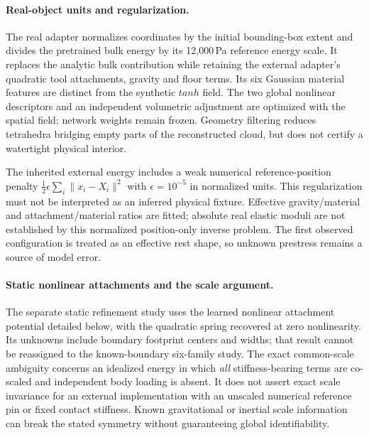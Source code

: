 \paragraph{Real-object units and regularization.}
The real adapter normalizes coordinates by the initial bounding-box extent
and divides the pretrained bulk energy by its 12,000\,Pa reference energy
scale. It replaces the analytic bulk contribution while retaining the
external adapter's quadratic tool attachments, gravity and floor terms.
Its six Gaussian material features are distinct from the synthetic
$tanh$ field. The two global nonlinear descriptors and an independent
volumetric adjustment are optimized with the spatial field; network weights
remain frozen. Geometry filtering reduces tetrahedra bridging empty parts
of the reconstructed cloud, but does not certify a watertight physical
interior.

The inherited external energy includes a weak numerical reference-position
penalty $\tfrac12\epsilon\sum_i\|x_i-X_i\|^2$ with $\epsilon=10^{-5}$ in
normalized units. This regularization must not be interpreted as an inferred
physical fixture. Effective gravity/material and attachment/material ratios
are fitted; absolute real elastic moduli are not established by this
normalized position-only inverse problem. The first observed configuration
is treated as an effective rest shape, so unknown prestress remains a source
of model error.

\paragraph{Static nonlinear attachments and the scale argument.}
The separate static refinement study uses the learned nonlinear attachment
potential detailed below, with the quadratic spring recovered at zero
nonlinearity. Its unknowns include boundary footprint centers and widths;
that result cannot be reassigned to the known-boundary six-family study.
The exact common-scale ambiguity concerns an idealized energy in which
\emph{all} stiffness-bearing terms are co-scaled and independent body loading
is absent. It does not assert exact scale invariance for an external
implementation with an unscaled numerical reference pin or fixed contact
stiffness. Known gravitational or inertial scale information can break the
stated symmetry without guaranteeing global identifiability.
